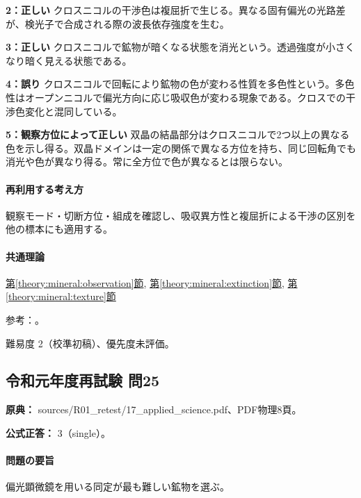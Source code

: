 \noindent\textbf{2：正しい} クロスニコルの干渉色は複屈折で生じる。異なる固有偏光の光路差が、検光子で合成される際の波長依存強度を生む。\par

\noindent\textbf{3：正しい} クロスニコルで鉱物が暗くなる状態を消光という。透過強度が小さくなり暗く見える状態である。\par

\noindent\textbf{4：誤り} クロスニコルで回転により鉱物の色が変わる性質を多色性という。多色性はオープンニコルで偏光方向に応じ吸収色が変わる現象である。クロスでの干渉色変化と混同している。\par

\noindent\textbf{5：観察方位によって正しい} 双晶の結晶部分はクロスニコルで2つ以上の異なる色を示し得る。双晶ドメインは一定の関係で異なる方位を持ち、同じ回転角でも消光や色が異なり得る。常に全方位で色が異なるとは限らない。\par

\paragraph{再利用する考え方} 観察モード・切断方位・組成を確認し、吸収異方性と複屈折による干渉の区別を他の標本にも適用する。

\paragraph{共通理論} \hyperref[theory:mineral:observation]{第\ref*{theory:mineral:observation}節}, \hyperref[theory:mineral:extinction]{第\ref*{theory:mineral:extinction}節}, \hyperref[theory:mineral:texture]{第\ref*{theory:mineral:texture}節}

\par 参考：\cite{nelson_biaxial}。

\par 難易度 2（校準初稿）、優先度未評価。

\subsection{令和元年度再試験 問25}
\label{q:r01-ret-applied-25}

\noindent\textbf{原典：} sources/R01\_retest/17\_applied\_science.pdf、PDF物理8頁。

\textbf{公式正答：} 3（single）。

\paragraph{問題の要旨} 偏光顕微鏡を用いる同定が最も難しい鉱物を選ぶ。

